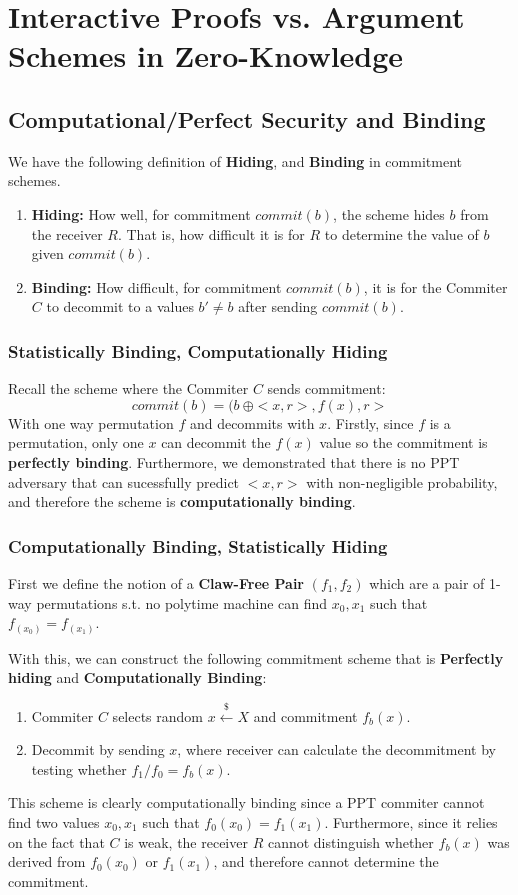 \documentclass[11pt]{article}
\begin{document}
\section{Interactive Proofs vs. Argument Schemes in Zero-Knowledge}
\subsection{Computational/Perfect Security and Binding}
We have the following definition of \textbf{Hiding}, and \textbf{Binding} in commitment schemes.
\begin{enumerate}
    \item \textbf{Hiding:} How well, for commitment $commit(b)$, the scheme hides $b$ from the receiver $R$. That is, how difficult it is for $R$ to determine the value of $b$ given $commit(b)$.
    \item \textbf{Binding:} How difficult, for commitment $commit(b)$, it is for the Commiter $C$ to decommit to a values $b' \neq b$ after sending $commit(b)$.
\end{enumerate}
\subsubsection{Statistically Binding, Computationally Hiding}
Recall the scheme where the Commiter $C$ sends commitment:
$$commit(b) = (b\ \oplus <x,r>, f(x), r>$$
With one way permutation $f$ and decommits with $x$. Firstly, since $f$ is a permutation, only one $x$ can decommit the $f(x)$ value so the commitment is \textbf{perfectly binding}. Furthermore, we demonstrated that there is no PPT adversary that can sucessfully predict $<x,r>$ with non-negligible probability, and therefore the scheme is \textbf{computationally binding}.
\subsubsection{Computationally Binding, Statistically Hiding}
First we define the notion of a \textbf{Claw-Free Pair} $(f_1,f_2)$ which are a pair of 1-way permutations s.t. no polytime machine can find $x_0,x_1$ such that $f_(x_0) = f_(x_1)$.
\vspace{1em}

With this, we can construct the following commitment scheme that is \textbf{Perfectly hiding} and \textbf{Computationally Binding}:
\begin{enumerate}
    \item Commiter $C$ selects random $x \overset{\$}{\leftarrow} X$ and commitment $f_b(x)$.
    \item Decommit by sending $x$, where receiver can calculate the decommitment by testing whether $f_1/f_0 = f_b(x)$.
\end{enumerate}
This scheme is clearly computationally binding since a PPT commiter cannot find two values $x_0,x_1$ such that $f_0(x_0) = f_1(x_1)$. Furthermore, since it relies on the fact that $C$ is weak, the receiver $R$ cannot distinguish whether $f_b(x)$ was derived from $f_0(x_0)$ or $f_1(x_1)$, and therefore cannot determine the commitment.
\vspace{1em}
\end{document}
